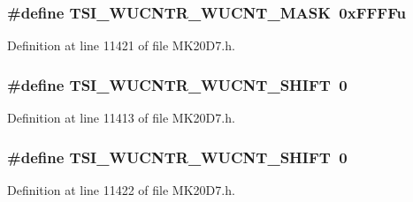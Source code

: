 \subsubsection[{\texorpdfstring{T\+S\+I\+\_\+\+W\+U\+C\+N\+T\+R\+\_\+\+W\+U\+C\+N\+T\+\_\+\+M\+A\+SK}{TSI_WUCNTR_WUCNT_MASK}}]{\setlength{\rightskip}{0pt plus 5cm}\#define T\+S\+I\+\_\+\+W\+U\+C\+N\+T\+R\+\_\+\+W\+U\+C\+N\+T\+\_\+\+M\+A\+SK~0x\+F\+F\+F\+Fu}\hypertarget{group___t_s_i___register___masks_gaa12e0ab73453118119dc56599e0a5598}{}\label{group___t_s_i___register___masks_gaa12e0ab73453118119dc56599e0a5598}


Definition at line 11421 of file M\+K20\+D7.\+h.

\subsubsection[{\texorpdfstring{T\+S\+I\+\_\+\+W\+U\+C\+N\+T\+R\+\_\+\+W\+U\+C\+N\+T\+\_\+\+S\+H\+I\+FT}{TSI_WUCNTR_WUCNT_SHIFT}}]{\setlength{\rightskip}{0pt plus 5cm}\#define T\+S\+I\+\_\+\+W\+U\+C\+N\+T\+R\+\_\+\+W\+U\+C\+N\+T\+\_\+\+S\+H\+I\+FT~0}\hypertarget{group___t_s_i___register___masks_gab6de5e2e100b2608c1837b6114fb5117}{}\label{group___t_s_i___register___masks_gab6de5e2e100b2608c1837b6114fb5117}


Definition at line 11413 of file M\+K20\+D7.\+h.

\subsubsection[{\texorpdfstring{T\+S\+I\+\_\+\+W\+U\+C\+N\+T\+R\+\_\+\+W\+U\+C\+N\+T\+\_\+\+S\+H\+I\+FT}{TSI_WUCNTR_WUCNT_SHIFT}}]{\setlength{\rightskip}{0pt plus 5cm}\#define T\+S\+I\+\_\+\+W\+U\+C\+N\+T\+R\+\_\+\+W\+U\+C\+N\+T\+\_\+\+S\+H\+I\+FT~0}\hypertarget{group___t_s_i___register___masks_gab6de5e2e100b2608c1837b6114fb5117}{}\label{group___t_s_i___register___masks_gab6de5e2e100b2608c1837b6114fb5117}


Definition at line 11422 of file M\+K20\+D7.\+h.

